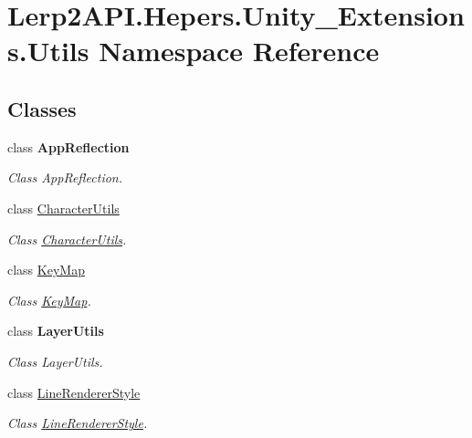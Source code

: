 \hypertarget{namespace_lerp2_a_p_i_1_1_hepers_1_1_unity___extensions_1_1_utils}{}\section{Lerp2\+A\+P\+I.\+Hepers.\+Unity\+\_\+\+Extensions.\+Utils Namespace Reference}
\label{namespace_lerp2_a_p_i_1_1_hepers_1_1_unity___extensions_1_1_utils}
\subsection*{Classes}
\begin{DoxyCompactItemize}
\item 
class {\bfseries App\+Reflection}
\begin{DoxyCompactList}\small\item\em Class App\+Reflection. \end{DoxyCompactList}\item 
class \hyperlink{class_lerp2_a_p_i_1_1_hepers_1_1_unity___extensions_1_1_utils_1_1_character_utils}{Character\+Utils}
\begin{DoxyCompactList}\small\item\em Class \hyperlink{class_lerp2_a_p_i_1_1_hepers_1_1_unity___extensions_1_1_utils_1_1_character_utils}{Character\+Utils}. \end{DoxyCompactList}\item 
class \hyperlink{class_lerp2_a_p_i_1_1_hepers_1_1_unity___extensions_1_1_utils_1_1_key_map}{Key\+Map}
\begin{DoxyCompactList}\small\item\em Class \hyperlink{class_lerp2_a_p_i_1_1_hepers_1_1_unity___extensions_1_1_utils_1_1_key_map}{Key\+Map}. \end{DoxyCompactList}\item 
class {\bfseries Layer\+Utils}
\begin{DoxyCompactList}\small\item\em Class Layer\+Utils. \end{DoxyCompactList}\item 
class \hyperlink{class_lerp2_a_p_i_1_1_hepers_1_1_unity___extensions_1_1_utils_1_1_line_renderer_style}{Line\+Renderer\+Style}
\begin{DoxyCompactList}\small\item\em Class \hyperlink{class_lerp2_a_p_i_1_1_hepers_1_1_unity___extensions_1_1_utils_1_1_line_renderer_style}{Line\+Renderer\+Style}. \end{DoxyCompactList}\item 

\end{DoxyCompactItemize}
